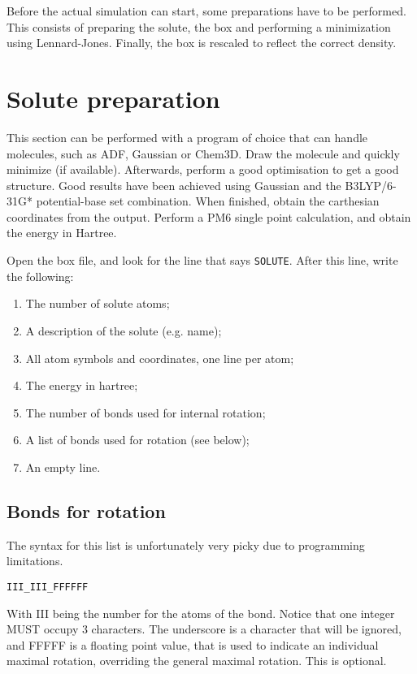 Before the actual simulation can start, some preparations have to be performed.
This consists of preparing the solute, the box and performing a minimization 
using Lennard-Jones. Finally, the box is rescaled to reflect the correct 
density.

\section{Solute preparation}
This section can be performed with a program of choice that can handle 
molecules, such as ADF, Gaussian or Chem3D. Draw the molecule and quickly 
minimize (if available). Afterwards, perform a good optimisation to get a good 
structure. Good results have been achieved using Gaussian and the B3LYP/6-31G* 
potential-base set combination.
When finished, obtain the carthesian coordinates from the output. Perform a PM6 
single point calculation, and obtain the energy in Hartree.

 Open the box file, and look for the line that says \verb|SOLUTE|. After this 
 line, write the following:

\begin{enumerate}
	\item The number of solute atoms;
	\item A description of the solute (e.g. name);
	\item All atom symbols and coordinates, one line per atom;
	\item The energy in hartree;
	\item The number of bonds used for internal rotation;
	\item A list of bonds used for rotation (see below);
	\item An empty line.
\end{enumerate}

\subsection{Bonds for rotation}
The syntax for this list is unfortunately very picky due to programming 
limitations. 

\verb|III_III_FFFFFF|

With III being the number for the atoms of the bond. Notice that one integer 
MUST occupy 3 characters. The underscore is a character that will be ignored, 
and FFFFF is a floating point value, that is used to indicate an individual 
maximal rotation, overriding the general maximal rotation. This is optional.

